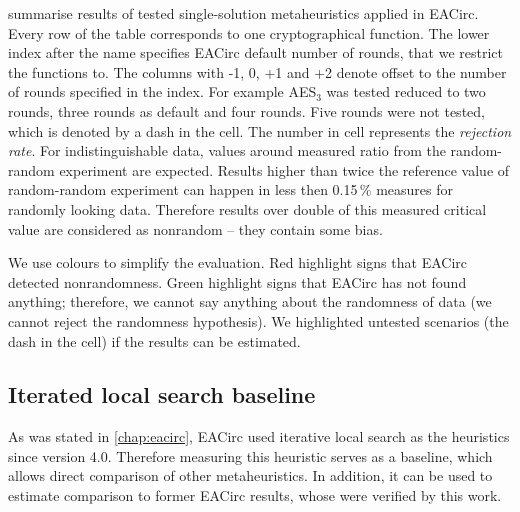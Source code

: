 \documentclass[
  print, %
  Table,   %
  nolof,     %
  nolot,     %
  11pt, %
  oneside  %
]{fithesis3}
\begin{document}
 summarise results of tested single-solution metaheuristics applied in EACirc. Every row of the table corresponds to one cryptographical function. The lower index after the name specifies EACirc default number of rounds, that we restrict the functions to. The columns with -1, 0, +1 and +2 denote offset to the number of rounds specified in the index. For example AES$_{3}$ was tested reduced to two rounds, three rounds as default and four rounds. Five rounds were not tested, which is denoted by a dash in the cell. The number in cell represents the \textit{rejection rate}. For indistinguishable data, values around measured ratio from the random-random experiment are expected. Results higher than twice the reference value of random-random experiment can happen in less then 0.15\,\% measures for randomly looking data. Therefore results over double of this measured critical value are considered as nonrandom -- they contain some bias.

We use colours to simplify the evaluation. Red highlight signs that EACirc detected nonrandomness. Green highlight signs that EACirc has not found anything; therefore, we cannot say anything about the randomness of data (we cannot reject the randomness hypothesis). We highlighted untested scenarios (the dash in the cell) if the results can be estimated.

\subsection{Iterated local search baseline}
\label{subsec:res-ss-ils}

As was stated in \cref{chap:eacirc}, EACirc used iterative local search as the heuristics since version 4.0. Therefore measuring this heuristic serves as a baseline, which allows direct comparison of other metaheuristics. In addition, it can be used to estimate comparison to former EACirc results, whose were verified by this work.
\end{document}
